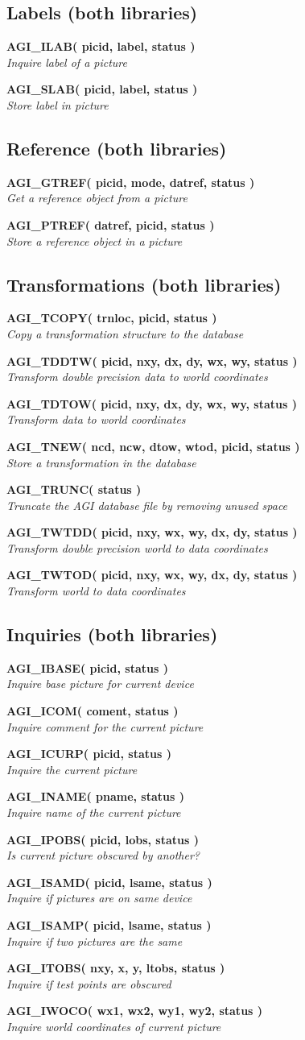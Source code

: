\documentclass[twoside,11pt]{starlink}
\providecommand{\noteroutine}[2]{\textbf{#1}\hspace*{\fill}\nopagebreak \\
                             \hspace*{3em}\emph{#2}\hspace*{\fill}\par}
\begin{document}
\subsection{Labels (both libraries)}
\noteroutine{AGI\_ILAB( picid, label, status )}
        {Inquire label of a picture}
\noteroutine{AGI\_SLAB( picid, label, status )}
        {Store label in picture}

\subsection{Reference (both libraries)}
\noteroutine{AGI\_GTREF( picid, mode, datref, status )}
        {Get a reference object from a picture}
\noteroutine{AGI\_PTREF( datref, picid, status )}
        {Store a reference object in a picture}

\subsection{Transformations (both libraries)}
\noteroutine{AGI\_TCOPY( trnloc, picid, status )}
        {Copy a transformation structure to the database}
\noteroutine{AGI\_TDDTW( picid, nxy, dx, dy, wx, wy, status )}
        {Transform double precision data to world coordinates}
\noteroutine{AGI\_TDTOW( picid, nxy, dx, dy, wx, wy, status )}
        {Transform data to world coordinates}
\noteroutine{AGI\_TNEW( ncd, ncw, dtow, wtod, picid, status )}
        {Store a transformation in the database}
\noteroutine{AGI\_TRUNC( status )}
        {Truncate the AGI database file by removing unused space}
\noteroutine{AGI\_TWTDD( picid, nxy, wx, wy, dx, dy, status )}
        {Transform double precision world to data coordinates}
\noteroutine{AGI\_TWTOD( picid, nxy, wx, wy, dx, dy, status )}
        {Transform world to data coordinates}

\subsection{Inquiries (both libraries)}
\noteroutine{AGI\_IBASE( picid, status )}
        {Inquire base picture for current device}
\noteroutine{AGI\_ICOM( coment, status )}
        {Inquire comment for the current picture}
\noteroutine{AGI\_ICURP( picid, status )}
        {Inquire the current picture}
\noteroutine{AGI\_INAME( pname, status )}
        {Inquire name of the current picture}
\noteroutine{AGI\_IPOBS( picid, lobs, status )}
        {Is current picture obscured by another?}
\noteroutine{AGI\_ISAMD( picid, lsame, status )}
        {Inquire if pictures are on same device}
\noteroutine{AGI\_ISAMP( picid, lsame, status )}
        {Inquire if two pictures are the same}
\noteroutine{AGI\_ITOBS( nxy, x, y, ltobs, status )}
        {Inquire if test points are obscured}
\noteroutine{AGI\_IWOCO( wx1, wx2, wy1, wy2, status )}
        {Inquire world coordinates of current picture}
\end{document}
